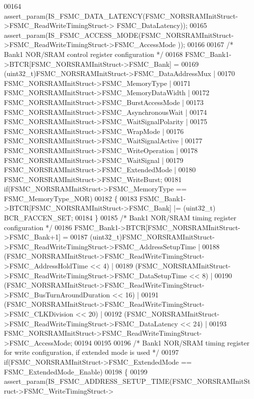 \begin{DoxyCode}
00164   assert_param(IS\_FSMC\_DATA\_LATENCY(FSMC\_NORSRAMInitStruct->FSMC\_ReadWriteTimingStruct->
      FSMC\_DataLatency));
00165   assert_param(IS\_FSMC\_ACCESS\_MODE(FSMC\_NORSRAMInitStruct->FSMC\_ReadWriteTimingStruct->FSMC\_AccessMode
      ));
00166 
00167   \textcolor{comment}{/* Bank1 NOR/SRAM control register configuration */}
00168   FSMC_Bank1->BTCR[FSMC\_NORSRAMInitStruct->FSMC\_Bank] =
00169             (uint32\_t)FSMC\_NORSRAMInitStruct->FSMC\_DataAddressMux |
00170             FSMC\_NORSRAMInitStruct->FSMC\_MemoryType |
00171             FSMC\_NORSRAMInitStruct->FSMC\_MemoryDataWidth |
00172             FSMC\_NORSRAMInitStruct->FSMC\_BurstAccessMode |
00173             FSMC\_NORSRAMInitStruct->FSMC\_AsynchronousWait |
00174             FSMC\_NORSRAMInitStruct->FSMC\_WaitSignalPolarity |
00175             FSMC\_NORSRAMInitStruct->FSMC\_WrapMode |
00176             FSMC\_NORSRAMInitStruct->FSMC\_WaitSignalActive |
00177             FSMC\_NORSRAMInitStruct->FSMC\_WriteOperation |
00178             FSMC\_NORSRAMInitStruct->FSMC\_WaitSignal |
00179             FSMC\_NORSRAMInitStruct->FSMC\_ExtendedMode |
00180             FSMC\_NORSRAMInitStruct->FSMC\_WriteBurst;
00181   \textcolor{keywordflow}{if}(FSMC\_NORSRAMInitStruct->FSMC_MemoryType == FSMC_MemoryType_NOR)
00182   \{
00183     FSMC_Bank1->BTCR[FSMC\_NORSRAMInitStruct->FSMC\_Bank] |= (uint32\_t)
      BCR_FACCEN_SET;
00184   \}
00185   \textcolor{comment}{/* Bank1 NOR/SRAM timing register configuration */}
00186   FSMC_Bank1->BTCR[FSMC\_NORSRAMInitStruct->FSMC\_Bank+1] =
00187             (uint32\_t)FSMC\_NORSRAMInitStruct->FSMC\_ReadWriteTimingStruct->FSMC\_AddressSetupTime |
00188             (FSMC\_NORSRAMInitStruct->FSMC\_ReadWriteTimingStruct->FSMC\_AddressHoldTime << 4) |
00189             (FSMC\_NORSRAMInitStruct->FSMC\_ReadWriteTimingStruct->FSMC\_DataSetupTime << 8) |
00190             (FSMC\_NORSRAMInitStruct->FSMC\_ReadWriteTimingStruct->FSMC\_BusTurnAroundDuration << 16) |
00191             (FSMC\_NORSRAMInitStruct->FSMC\_ReadWriteTimingStruct->FSMC\_CLKDivision << 20) |
00192             (FSMC\_NORSRAMInitStruct->FSMC\_ReadWriteTimingStruct->FSMC\_DataLatency << 24) |
00193              FSMC\_NORSRAMInitStruct->FSMC\_ReadWriteTimingStruct->FSMC\_AccessMode;
00194 
00195 
00196   \textcolor{comment}{/* Bank1 NOR/SRAM timing register for write configuration, if extended mode is used */}
00197   \textcolor{keywordflow}{if}(FSMC\_NORSRAMInitStruct->FSMC_ExtendedMode == FSMC_ExtendedMode_Enable)
00198   \{
00199     assert_param(IS\_FSMC\_ADDRESS\_SETUP\_TIME(FSMC\_NORSRAMInitStruct->FSMC\_WriteTimingStruct->

\end{DoxyCode}
